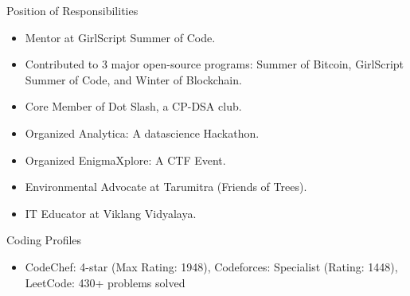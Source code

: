\documentclass{resume} %
\begin{document}
\begin{rSection}{Position of Responsibilities} 
\begin{itemize}
    \itemsep -3pt {} 
     \item Mentor at GirlScript Summer of Code.
      \item Contributed to 3 major open-source programs: Summer of Bitcoin, GirlScript Summer of Code, and Winter of Blockchain.
     \item Core Member of Dot Slash, a CP-DSA club.
     \item Organized Analytica: A datascience Hackathon.
     \item Organized EnigmaXplore: A CTF Event.
     \item Environmental Advocate at Tarumitra (Friends of Trees).
     \item IT Educator at Viklang Vidyalaya.
 \end{itemize}
\end{rSection}
\begin{rSection}{Coding Profiles}

\begin{itemize}
    \item CodeChef: 4-star (Max Rating: 1948), Codeforces: Specialist (Rating: 1448), LeetCode: 430+ problems solved
\end{itemize}

\end{rSection}

\end{document}

